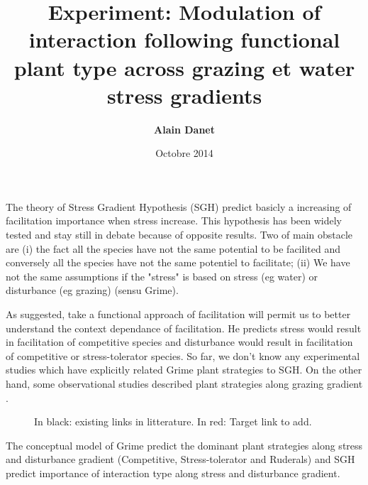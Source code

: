 \documentclass[12pt]{report} %
\title{Experiment: Modulation of interaction following functional plant type across grazing et water stress gradients}
\author{\textbf{Alain Danet}}
\date{Octobre 2014}
\begin{document}
\maketitle

\begin{abstract}

\end{abstract}



The theory of Stress Gradient Hypothesis (SGH) predict basicly a increasing of facilitation importance when stress increase. This hypothesis has been widely tested and stay still in debate because of opposite results. Two of main obstacle are (i) the fact all the species have not the same potential to be facilited and conversely all the species have not the same potentiel to facilitate; (ii) We have not the same assumptions if the "stress" is based on stress (eg water) or disturbance (eg grazing) (sensu Grime).

As \citet{Butterfield2013} suggested, take a functional approach of facilitation will permit us to better understand the context dependance of facilitation. He predicts stress would result in facilitation of competitive species and disturbance would result in facilitation of competitive or stress-tolerator species. So far, we don't know any experimental studies which have explicitly related Grime plant strategies to SGH. On the other hand, some observational studies described plant strategies along grazing gradient \citep{DIAZ2007}.

\begin{figure}
\begin{center}
\end{center}
\caption{In black: existing links in litterature. In red: Target link to add.}
\end{figure}


The conceptual model of Grime predict the dominant plant strategies along stress and disturbance gradient (Competitive, Stress-tolerator and Ruderals) and SGH predict importance of interaction type along stress and disturbance gradient.
\end{document}
